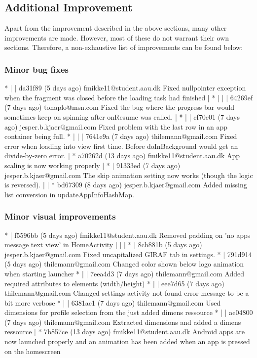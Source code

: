 \subsection{Additional Improvement}

Apart from the improvement described in the above sections, many other improvements are made.
However, most of these do not warrant their own sections.
Therefore, a non-exhaustive list of improvements can be found below:

\subsubsection{Minor bug fixes}
* | | da31f89 (5 days ago) fmikke11@student.aau.dk Fixed nullpointer exception when the fragment was closed before the loading task had finished
| * | | | 64269ef (7 days ago) tonaplo@msn.com Fixed the bug where the progress bar would sometimes keep on spinning after onResume was called.
| * | | cf70e01 (7 days ago) jesper.b.kjaer@gmail.com Fixed problem with the last row in an app container being full.
* | | | 7641e9a (7 days ago) thilemann@gmail.com Fixed error when loading into view first time. Before doInBackground would get an divide-by-zero error.
| * a70262d (13 days ago) fmikke11@student.aau.dk App scaling is now working properly
| * | 91333ed (7 days ago) jesper.b.kjaer@gmail.com The skip animation setting now works (though the logic is reversed).
| | * bd67309 (8 days ago) jesper.b.kjaer@gmail.com Added missing list conversion in updateAppInfoHashMap.

\subsubsection{Minor visual improvements}
* | f5596bb (5 days ago) fmikke11@student.aau.dk Removed padding on 'no apps message text view' in HomeActivity
| | | * | 8cb881b (5 days ago) jesper.b.kjaer@gmail.com Fixed uncapitalized GIRAF tab in settings.
* | 791d914 (5 days ago) thilemann@gmail.com Changed color shown below logo animation when starting launcher
* | | 7eea4d3 (7 days ago) thilemann@gmail.com Added required attributes to elements (width/height)
* | | eee7d65 (7 days ago) thilemann@gmail.com Changed settings activity not found error message to be a bit more verbose
* | | 6381ac1 (7 days ago) thilemann@gmail.com Used dimensions for profile selection from the just added dimens ressource
* | | ae04800 (7 days ago) thilemann@gmail.com Extracted dimensions and added a dimens ressource
| * 7b857ce (13 days ago) fmikke11@student.aau.dk Android apps are now launched properly and an animation has been added when an app is pressed on the homescreen
